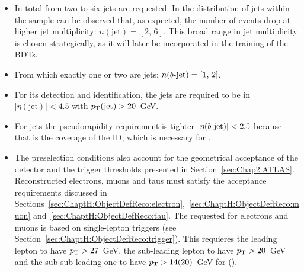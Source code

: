 \begin{itemize}
	\item In total from two to six jets are requested. In the distribution of jets within the \tHq sample 
	can be observed that, as expected, the number of \tHq events drop at higher jet multiplicity: $n(\text{jet})=[2,\,6]$.
	This broad range in jet multiplicity is chosen strategically, as it will later be  incorporated
	in the training of the BDTs.
	\item From which exactly one or two are \btagged jets: $n(b\text{-jet})=[1,\,2]$.
	\item For its detection and identification, the jets are required to be in $|\eta(\text{jet})|<4.5$ with $p_{\text{T}}(\text{jet})>20$~GeV.
	\item For \btagged jets the pseudorapidity requirement is tighter $|\eta(b\text{-jet})|<2.5$ because that is the
	coverage of the ID, which is necessary for \btag.
	\item The preselection conditions also account for the geometrical acceptance of the 
detector and the trigger thresholds presented in Section~\ref{sec:Chap2:ATLAS}. Reconstructed electrons, muons and taus must satisfy the acceptance requirements discussed in Sections~\ref{sec:ChaptH:ObjectDefReco:electron},~\ref{sec:ChaptH:ObjectDefReco:muon} and~\ref{sec:ChaptH:ObjectDefReco:tau}. The \pT requested for electrons and muons is based on single-lepton triggers (see Section~\ref{sec:ChaptH:ObjectDefReco:trigger}).
	This requieres the leading lepton to have \mbox{$p_{\text{T}}>27$~GeV}, the sub-leading lepton to have \mbox{$p_{\text{T}}>20$~GeV} and the sub-sub-leading one  to have \mbox{$p_{\text{T}}>14 (20)$~GeV} for \emu (\tauhad).
\end{itemize}



